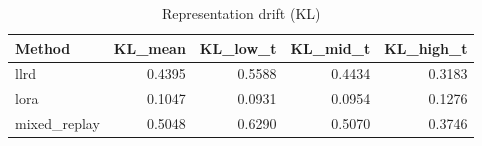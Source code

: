 \begin{table}[htbp]
\centering
\caption{Representation drift (KL)}
\label{tab:repr-drift}
\begin{tabular}{lrrrr}
\toprule
\textbf{Method} & \textbf{KL\_mean} & \textbf{KL\_low\_t} & \textbf{KL\_mid\_t} & \textbf{KL\_high\_t} \\
\midrule
llrd & 0.4395 & 0.5588 & 0.4434 & 0.3183 \\
lora & 0.1047 & 0.0931 & 0.0954 & 0.1276 \\
mixed\_replay & 0.5048 & 0.6290 & 0.5070 & 0.3746 \\
\bottomrule
\end{tabular}
\end{table}